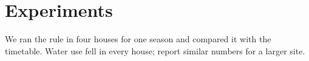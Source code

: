 \section{Experiments}
We ran the rule in four houses for one season and compared it with the
timetable. Water use fell in every house; \textcite{lund21} report similar
numbers for a larger site.

